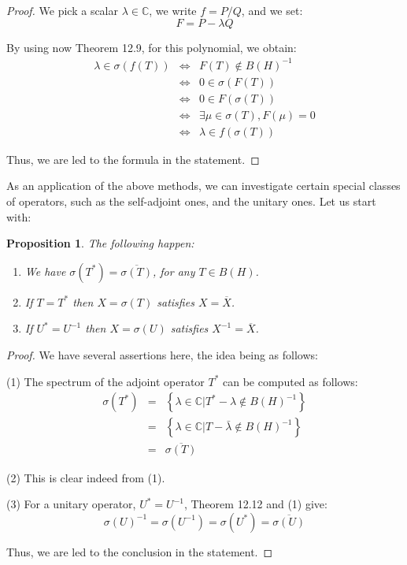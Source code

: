 \documentclass[12pt]{amsbook}
\newtheorem{proposition}[theorem]{Proposition}
\begin{document}
\begin{proof}
We pick a scalar $\lambda\in\mathbb C$, we write $f=P/Q$, and we set:
$$F=P-\lambda Q$$

By using now Theorem 12.9, for this polynomial, we obtain:
\begin{eqnarray*}
\lambda\in\sigma(f(T))
&\iff&F(T)\notin B(H)^{-1}\\
&\iff&0\in\sigma(F(T))\\
&\iff&0\in F(\sigma(T))\\
&\iff&\exists\mu\in\sigma(T),F(\mu)=0\\
&\iff&\lambda\in f(\sigma(T))
\end{eqnarray*}

Thus, we are led to the formula in the statement.
\end{proof}

As an application of the above methods, we can investigate certain special classes of operators, such as the self-adjoint ones, and the unitary ones. Let us start with:


\begin{proposition}
The following happen:
\begin{enumerate}
\item We have $\sigma(T^*)=\overline{\sigma(T)}$, for any $T\in B(H)$.

\item If $T=T^*$ then $X=\sigma(T)$ satisfies $X=\overline{X}$.

\item If $U^*=U^{-1}$ then $X=\sigma(U)$ satisfies $X^{-1}=\overline{X}$.
\end{enumerate}
\end{proposition}

\begin{proof}
We have several assertions here, the idea being as follows:

\medskip

(1) The spectrum of the adjoint operator $T^*$ can be computed as follows:
\begin{eqnarray*}
\sigma(T^*)
&=&\left\{\lambda\in\mathbb C\Big|T^*-\lambda\notin B(H)^{-1}\right\}\\
&=&\left\{\lambda\in\mathbb C\Big|T-\bar{\lambda}\notin B(H)^{-1}\right\}\\
&=&\overline{\sigma(T)}
\end{eqnarray*}

(2) This is clear indeed from (1).

\medskip

(3) For a unitary operator, $U^*=U^{-1}$, Theorem 12.12 and (1) give:
$$\sigma(U)^{-1}=\sigma(U^{-1})=\sigma(U^*)=\overline{\sigma(U)}$$

Thus, we are led to the conclusion in the statement.
\end{proof}
\end{document}
